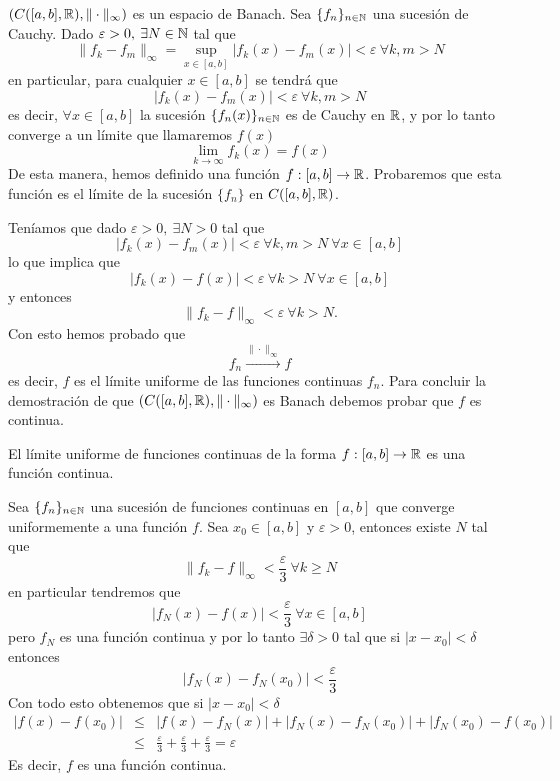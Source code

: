\begin{ejemplo}
$(C([a,b],\mathbb{R}),\|\cdot\|_\infty)$ es un espacio de Banach. Sea $\{f_n\}_{n\in\mathbb{N}}$ una sucesi\'on de Cauchy. Dado $\varepsilon >0,\:\exists N\in\mathbb{N}$ tal que
$$\|f_k-f_m\|_\infty=\sup_{x\in[a,b]}{|f_k(x)-f_m(x)|} <\varepsilon\: \forall k,m>N$$ 
en particular, para cualquier $x\in[a,b]$ se tendr\'a que $$|f_k(x)-f_m(x)|<\varepsilon\: \forall k,m>N$$ es decir, $\forall x\in [a,b]$ la sucesi\'on $\{f_n(x)\}_{n\in\mathbb{N}}$ es de Cauchy en $\mathbb{R}$, y por lo tanto converge a un l\'imite que llamaremos $f(x)$ $$\lim_{k\rightarrow\infty}{f_k(x)}=f(x)$$ De esta manera, hemos definido una funci\'on $f:[a,b]\to\mathbb{R}$. Probaremos que esta funci\'on es el l\'imite de la sucesi\'on $\{f_n\}$ en $C([a,b],\mathbb{R})$.

Ten\'iamos que dado $\varepsilon >0,\:\exists N>0$ tal que 
$$|f_k(x)-f_m(x)|<\varepsilon\: \forall k,m>N\:\forall x\in [a,b]$$ 
lo que implica que 
$$|f_k(x)-f(x)|<\varepsilon\: \forall k>N\:\forall x\in [a,b]$$ 
y entonces 
$$\|f_k-f\|_\infty <\varepsilon \: \forall k>N.$$ 
Con esto hemos probado que
$$f_n\stackrel{\|\cdot\|_\infty}{\rightarrow}f$$ 
es decir, $f$ es el l\'imite uniforme de las funciones continuas $f_n$. Para concluir la demostraci\'on de que $(C([a,b],\mathbb{R}),\|\cdot\|_\infty)$ es Banach debemos probar que $f$ es continua.
\end{ejemplo}

\begin{proposicion}
El l\'imite uniforme de funciones continuas  de la forma $f:[a,b]\to \mathbb{R}$ es una funci\'on continua.
\end{proposicion}

\begin{demostracion}
Sea $\{f_n\}_{n\in\mathbb{N}}$ una sucesi\'on de funciones continuas en $[a,b]$ que converge uniformemente a una funci\'on $f$. Sea $x_0\in [a,b]$ y $\varepsilon>0$, entonces existe $N$ tal que 
$$\|f_k-f\|_\infty <\frac{\varepsilon}{3}\:\forall k\geq N$$ 
en particular tendremos que
$$|f_N(x)-f(x)|<\frac{\varepsilon}{3}\:\forall x\in [a,b]$$ 
pero $f_N$ es una funci\'on continua y por lo tanto $\exists\delta >0$ tal que si $|x-x_0|<\delta$ entonces
$$|f_N(x)-f_N(x_0)|<\frac{\varepsilon}{3}$$ 
Con todo esto obtenemos que si $|x-x_0|<\delta$
\begin{eqnarray*}
 |f(x)-f(x_0)| &\leq & |f(x)-f_N(x)|+|f_N(x)-f_N(x_0)|+|f_N(x_0)-f(x_0)| \\
               &\leq & \frac{\varepsilon}{3}+\frac{\varepsilon}{3}+\frac{\varepsilon}{3}=\varepsilon
\end{eqnarray*}
Es decir, $f$ es una funci\'on continua.
\end{demostracion}

